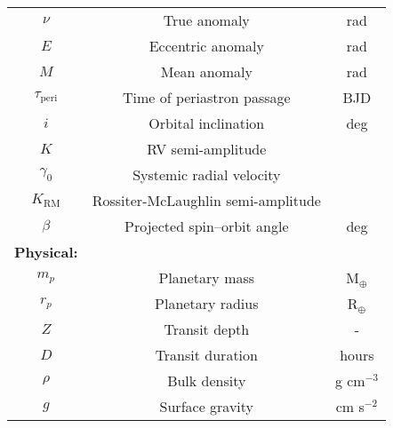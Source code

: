 \begin{table*}
\begin{tabular}{ccc}
  $\nu$ & True anomaly & rad \\
  $E$ & Eccentric anomaly & rad \\
  $M$ & Mean anomaly & rad \\
  $\tau_{\text{peri}}$ & Time of periastron passage & BJD \\
  $i$ & Orbital inclination & deg \\
  $K$ & RV semi-amplitude & \mps{} \\
  $\gamma_0$ & Systemic radial velocity & \mps{} \\
  $K_{\text{RM}}$ & Rossiter-McLaughlin semi-amplitude & \mps{} \\
  $\beta$ & Projected spin--orbit angle & deg \\
  \textbf{Physical:} & & \\
  $m_p$ & Planetary mass & M$_{\oplus}$ \\
  $r_p$ & Planetary radius & R$_{\oplus}$ \\
  $Z$ & Transit depth & - \\
  $D$ & Transit duration & hours \\
  $\rho$ & Bulk density & g cm$^{-3}$ \\
  $g$ & Surface gravity & cm s$^{-2}$ \\
  \end{tabular}
\end{table*}
